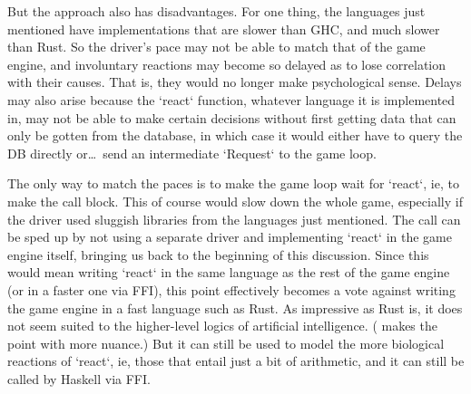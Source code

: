 But the approach also has disadvantages.
For one thing, the languages just mentioned have implementations that are
slower than GHC, and much slower than Rust.
So the driver's
pace may not be able to match that of the game engine, and involuntary
reactions may become so delayed as to lose correlation with their causes.
That is, they would no longer make psychological sense.
Delays may also arise because the `react` function, whatever language it is
implemented in,
may not be able to make certain decisions without first getting data that
can only be gotten from the database, in which case it would either have to
query the DB directly or\ldots\ send an intermediate `Request` to the game loop.

The only way to match the paces is to make the game loop wait for `react`,
ie, to make the call block.
This of course would slow down the whole game,
especially if the driver used sluggish libraries from the languages
just mentioned.
The call can be sped up by not using a separate driver
and implementing `react` in the game engine itself, bringing us back to the
beginning of this discussion.
Since this would mean writing `react` in
the same language as the rest of the game engine (or in a faster one via FFI),
this point effectively becomes a vote against writing the game engine
in a fast language such as Rust.
As impressive as Rust is, it does not seem suited to the higher-level logics of
artificial intelligence.
(
makes the point with more nuance.) But it can still be used to model the more
biological reactions of `react`, ie, those that entail just a bit of arithmetic,
and it can still be called by Haskell via FFI\@.
